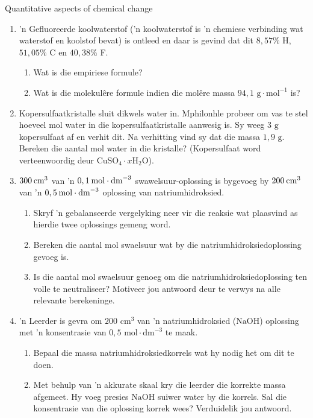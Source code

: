 \begin{eocexercises}{Quantitative aspects of chemical change}
\begin{enumerate}[noitemsep, label=\textbf{\arabic*}. ]
\item  'n Gefluoreerde koolwaterstof ('n koolwaterstof is 'n chemiese verbinding wat waterstof en koolstof bevat) is ontleed en daar is gevind dat dit $8,57\%$ H, $51,05\%$ C en $40,38\%$ F.
 \begin{enumerate}[noitemsep, label=\textbf{\alph*}. ] 
 \item Wat is die empiriese formule?
 \item Wat is die molekulêre formule indien die mol\^{e}re massa $94,1\text{ g}\cdot {\text{mol}}^{-1}$ is?
 \end{enumerate}
\item Kopersulfaatkristalle sluit dikwels water in. Mphilonhle probeer om vas te stel hoe\-veel mol water in die kopersulfaatkristalle aanwesig is. Sy weeg $3 \text{ g}$ kopersulfaat af en verhit dit. Na verhitting vind sy dat die massa $1,9 \text{ g}$. Bereken die aantal mol water in die kristalle? (Kopersulfaat word verteenwoordig deur ${\text{CuSO}}_{4}\cdot x{\text{H}}_{2}\text{O}$).        
\item $300\phantom{\rule{2pt}{0ex}}{\text{cm}}^{3}$ van 'n $0,1\phantom{\rule{2pt}{0ex}}\text{mol}\ensuremath{\cdot}{\text{dm}}^{-3}$ swawelsuur-oplossing is bygevoeg by $200\phantom{\rule{2pt}{0ex}}{\text{cm}}^{3}$ van 'n $0,5\phantom{\rule{2pt}{0ex}}\text{mol}\ensuremath{\cdot}{\text{dm}}^{-3}$ oplossing van natriumhidroksied.
 \begin{enumerate}[noitemsep, label=\textbf{\alph*}. ] 
 \item Skryf 'n gebalanseerde vergelyking neer vir die reaksie wat plaasvind as hierdie twee oplossings gemeng word.
 \item Bereken die aantal mol swaelsuur wat by die natriumhidroksiedoplossing gevoeg is.
 \item Is die aantal mol swaelsuur genoeg om die natriumhidroksiedoplossing ten volle te neutraliseer? Motiveer jou antwoord deur te verwys na alle relevante berekeninge.
 \end{enumerate}
\item 'n Leerder is gevra om $200 {\text{ cm}}^{3}$ van  'n natriumhidroksied ($\text{NaOH}$) oplossing met  'n konsentrasie van $0,5 \text{ mol} \cdot {\text{dm}}^{-3}$ te maak.
 \begin{enumerate}[noitemsep, label=\textbf{\alph*}. ] 
 \item Bepaal die massa natriumhidroksiedkorrels wat hy nodig het om dit te doen.
 \item Met behulp van 'n akkurate skaal kry die leerder die korrekte massa afgemeet. Hy voeg presies $\text{NaOH}$ suiwer water by die korrels. Sal die konsentrasie van die oplossing korrek wees? Verduidelik jou antwoord. 

\end{enumerate}
\end{enumerate}
\end{eocexercises}

